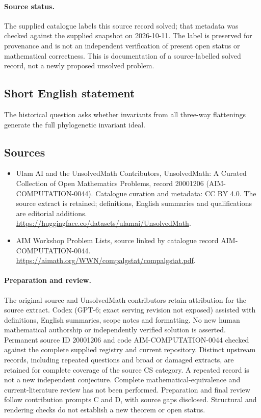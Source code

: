 \documentclass[11pt]{article}
\begin{document}
\paragraph{Source status.}
The supplied catalogue labels this source record solved; that metadata was checked against the supplied snapshot on 2026-10-11. The label is preserved for provenance and is not an independent verification of present open status or mathematical correctness. This is documentation of a source-labelled solved record, not a newly proposed unsolved problem.
\subsection{Short English statement}
The historical question asks whether invariants from all three-way flattenings generate the full phylogenetic invariant ideal.
\subsection{Sources}
\begin{itemize}
\item[\hypertarget{source:20001206:1}{S1}] Ulam AI and the UnsolvedMath Contributors, UnsolvedMath: A Curated Collection of Open Mathematics Problems, record 20001206 (AIM-COMPUTATION-0044). Catalogue curation and metadata: CC BY 4.0. The source extract is retained; definitions, English summaries and qualifications are editorial additions.
\url{https://huggingface.co/datasets/ulamai/UnsolvedMath}.
\item[\hypertarget{source:20001206:2}{S2}] AIM Workshop Problem Lists, source linked by catalogue record AIM-COMPUTATION-0044.
\url{https://aimath.org/WWN/compalgstat/compalgstat.pdf}.
\end{itemize}
\paragraph{Preparation and review.}
The original source and UnsolvedMath contributors retain attribution for the source extract. Codex (GPT-6; exact serving revision not exposed) assisted with definitions, English summaries, scope notes and formatting. No new human mathematical authorship or independently verified solution is asserted. Permanent source ID 20001206 and code AIM-COMPUTATION-0044 checked against the complete supplied registry and current repository. Distinct upstream records, including repeated questions and broad or damaged extracts, are retained for complete coverage of the source CS category. A repeated record is not a new independent conjecture. Complete mathematical-equivalence and current-literature review has not been performed. Preparation and final review follow contribution prompts C and D, with source gaps disclosed. Structural and rendering checks do not establish a new theorem or open status.
\label{end:20001206}
\end{document}
